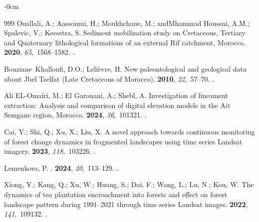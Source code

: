 \documentclass[geomatics,article,accept,pdftex,oneauthor]{Definitions/mdpi}
\begin{document}
\begin{adjustwidth}{-\extralength}{0cm}
\begin{thebibliography}{999}
Ouallali, A.; Aassoumi, H.; Moukhchane, M.; andMhammad Houssni, A.M.; Spalevic,
  V.; Keesstra, S.
\newblock Sediment mobilization study on Cretaceous, Tertiary and Quaternary
  lithological formations of an external Rif catchment, Morocco.
 {\bf 2020}, {\em 65},~1568--1582.
.

Bouziane~Khalloufi, D.O.; Lelièvre, H.
\newblock New paleontological and geological data about Jbel Tselfat (Late
  Cretaceous of Morocco).
 {\bf 2010}, {\em 22},~57--70.
.

{Ali EL-Omairi}, M.; {El Garouani}, A.; Shebl, A.
\newblock Investigation of lineament extraction: Analysis and comparison of
  digital elevation models in the Ait Semgane region, Morocco.
 {\bf
  2024}, {\em 36},~101321.
.

Cai, Y.; Shi, Q.; Xu, X.; Liu, X.
\newblock A novel approach towards continuous monitoring of forest change
  dynamics in fragmented landscapes using time series Landsat imagery.
 {\bf 2023}, {\em 118},~103226.
.

Lemenkova, P.
.
 {\bf 2024}, {\em 20},~113--129.
.

Xiong, Y.; Kang, Q.; Xu, W.; Huang, S.; Dai, F.; Wang, L.; Lu, N.; Kou, W.
\newblock The dynamics of tea plantation encroachment into forests and effect
  on forest landscape pattern during 1991–2021 through time series Landsat
  images.
 {\bf 2022}, {\em 141},~109132.
.


\end{thebibliography}
\end{adjustwidth}
\end{document}
